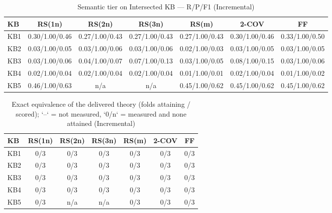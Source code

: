 \begin{table}[htbp]
\centering
\caption{Semantic tier on Intersected KB — R/P/F1 (Incremental)}
\label{tab:semantic_prf_incremental}
\begin{tabular}{lcccccc}
\toprule
KB & RS(1n) & RS(2n) & RS(3n) & RS(m) & 2-COV & FF \\
\midrule
KB1 & 0.30/1.00/0.46 & 0.27/1.00/0.43 & 0.27/1.00/0.43 & 0.27/1.00/0.43 & 0.30/1.00/0.46 & 0.33/1.00/0.50 \\
KB2 & 0.03/1.00/0.05 & 0.03/1.00/0.06 & 0.03/1.00/0.06 & 0.02/1.00/0.03 & 0.03/1.00/0.05 & 0.03/1.00/0.05 \\
KB3 & 0.03/1.00/0.06 & 0.04/1.00/0.07 & 0.07/1.00/0.13 & 0.03/1.00/0.05 & 0.08/1.00/0.15 & 0.03/1.00/0.06 \\
KB4 & 0.02/1.00/0.04 & 0.02/1.00/0.04 & 0.02/1.00/0.04 & 0.01/1.00/0.01 & 0.02/1.00/0.04 & 0.01/1.00/0.02 \\
KB5 & 0.46/1.00/0.63 & n/a & n/a & 0.45/1.00/0.62 & 0.45/1.00/0.62 & 0.45/1.00/0.62 \\
\bottomrule
\end{tabular}
\end{table}

\begin{table}[htbp]
\centering
\caption{Exact equivalence of the delivered theory (folds attaining / scored); `--` = not measured, `0/n` = measured and none attained (Incremental)}
\label{tab:exact_equiv_incremental}
\begin{tabular}{lcccccc}
\toprule
KB & RS(1n) & RS(2n) & RS(3n) & RS(m) & 2-COV & FF \\
\midrule
KB1 & 0/3 & 0/3 & 0/3 & 0/3 & 0/3 & 0/3 \\
KB2 & 0/3 & 0/3 & 0/3 & 0/3 & 0/3 & 0/3 \\
KB3 & 0/3 & 0/3 & 0/3 & 0/3 & 0/3 & 0/3 \\
KB4 & 0/3 & 0/3 & 0/3 & 0/3 & 0/3 & 0/3 \\
KB5 & 0/3 & n/a & n/a & 0/3 & 0/3 & 0/3 \\
\bottomrule
\end{tabular}
\end{table}

